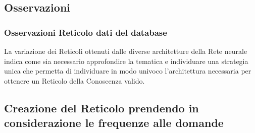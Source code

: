 \subsection{Osservazioni}
\subsubsection{Osservazioni Reticolo dati del database}
La variazione dei Reticoli ottenuti dalle diverse architetture della Rete neurale indica come sia necessario approfondire la tematica e individuare una strategia unica che permetta di individuare in modo univoco l'architettura necessaria per ottenere un Reticolo della Conoscenza valido.

\subsection{Creazione del Reticolo prendendo in considerazione le frequenze alle domande}
\label{Creazione del Reticolo prendendo in considerazione le frequenze alle domande}



